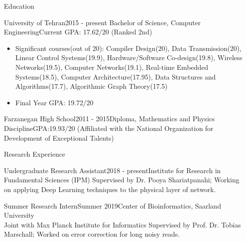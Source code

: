 \documentclass{resume}
\begin{document}

\begin{rSection}{Education}

\begin{rSubsection} {University of Tehran}{2015 - present} {Bachelor of Science, Computer Engineering}{Current GPA: 17.62/20 (Ranked 2nd)}
\begin{itemize} \itemsep -2pt
    \item Significant courses(out of 20): Compiler Design(20), Data Transmission(20), Linear Control Systems(19.9), Hardware/Software Co-design(19.8), Wireless Networks(19.5), Computer Networks(19.1), Real-time Embedded Systems(18.5), Computer Architecture(17.95), Data Structures and Algorithms(17.7), Algorithmic Graph Theory(17.5)
    \item Final Year GPA: 19.72/20
\end{itemize}
\end{rSubsection}

\begin{rSubsection}{Farzanegan High School}{2011 - 2015}{Diploma, Mathematics and Physics Discipline}{GPA:19.93/20}
(Affiliated with the National Organization for Development of Exceptional Talents)
\end{rSubsection}

\end{rSection}


\begin{rSection}{Research Experience}

\begin{rSubsection}{Undergraduate Research Assistant}{2018 - present}{Institute for Research in Fundamental Sciences (IPM)}{}
Supervised by Dr. Pooya Shariatpanahi; Working on applying Deep Learning techniques to the physical layer of network.
\end{rSubsection}

\begin{rSubsection}{Summer Research Intern}{Summer 2019}{Center of Bioinformatics, Saarland University\\Joint with Max Planck Institute for Informatics}{}
Supervised by Prof. Dr. Tobias Marschall; Worked on error correction for long noisy reads.
\end{rSubsection}

\end{rSection}
\end{document}
